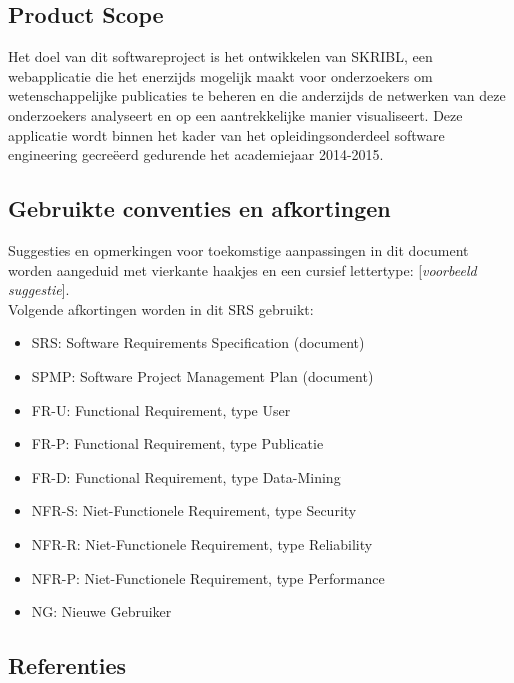 \documentclass{article}
\begin{document}
\subsection{Product Scope}
Het doel van dit softwareproject is het ontwikkelen van SKRIBL, een webapplicatie die het enerzijds mogelijk maakt voor onderzoekers om wetenschappelijke publicaties te beheren en die anderzijds de netwerken van deze onderzoekers analyseert en op een aantrekkelijke manier visualiseert. Deze applicatie wordt binnen het kader van het opleidingsonderdeel software engineering gecre\"{e}erd gedurende het academiejaar 2014-2015.

\subsection{Gebruikte conventies en afkortingen}
Suggesties en opmerkingen voor toekomstige aanpassingen in dit document worden aangeduid met vierkante haakjes en een cursief lettertype: [{\it voorbeeld suggestie}]. \newline
\\
\noindent Volgende afkortingen worden in dit SRS gebruikt:
\begin{itemize}
\item SRS: Software Requirements Specification (document)
\item SPMP: Software Project Management Plan (document)
\item FR-U: Functional Requirement, type User
\item FR-P: Functional Requirement, type Publicatie
\item FR-D: Functional Requirement, type Data-Mining
\item NFR-S: Niet-Functionele Requirement, type Security
\item NFR-R: Niet-Functionele Requirement, type Reliability
\item NFR-P: Niet-Functionele Requirement, type Performance
\item NG: Nieuwe Gebruiker
\end{itemize}


\subsection{Referenties}
\begingroup
\renewcommand{\section}[2]{}%

\endgroup
\end{document}
